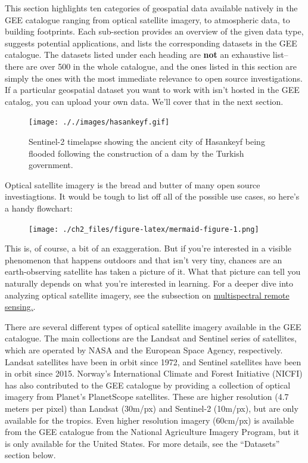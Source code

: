 \documentclass[
  letterpaper,
  DIV=11,
  numbers=noendperiod]{scrreprt}
\begin{document}
This section highlights ten categories of geospatial data available
natively in the GEE catalogue ranging from optical satellite imagery, to
atmospheric data, to building footprints. Each sub-section provides an
overview of the given data type, suggests potential applications, and
lists the corresponding datasets in the GEE catalogue. The datasets
listed under each heading are \textbf{not} an exhaustive list-- there
are over 500 in the whole catalogue, and the ones listed in this section
are simply the ones with the most immediate relevance to open source
investigations. If a particular geospatial dataset you want to work with
isn't hosted in the GEE catalog, you can upload your own data. We'll
cover that in the next section.

\begin{figure}

{\centering \texttt{[image: ././images/hasankeyf.gif]}

}

\caption{Sentinel-2 timelapse showing the ancient city of Hasankeyf
being flooded following the construction of a dam by the Turkish
government.}

\end{figure}

Optical satellite imagery is the bread and butter of many open source
investiagtions. It would be tough to list off all of the possible use
cases, so here's a handy flowchart:

\begin{figure}[H]

{\centering \texttt{[image: ./ch2\_files/figure-latex/mermaid-figure-1.png]}

}

\end{figure}

This is, of course, a bit of an exaggeration. But if you're interested
in a visible phenomenon that happens outdoors and that isn't very tiny,
chances are an earth-observing satellite has taken a picture of it. What
that picture can tell you naturally depends on what you're interested in
learning. For a deeper dive into analyzing optical satellite imagery,
see the subsection on
\protect\hyperlink{multispectral-remote-sensing-remote_sensing}{multispectral
remote sensing.}.

There are several different types of optical satellite imagery available
in the GEE catalogue. The main collections are the Landsat and Sentinel
series of satellites, which are operated by NASA and the European Space
Agency, respectively. Landsat satellites have been in orbit since 1972,
and Sentinel satellites have been in orbit since 2015. Norway's
International Climate and Forest Initiative (NICFI) has also contributed
to the GEE catalogue by providing a collection of optical imagery from
Planet's PlanetScope satellites. These are higher resolution (4.7 meters
per pixel) than Landsat (30m/px) and Sentinel-2 (10m/px), but are only
available for the tropics. Even higher resolution imagery (60cm/px) is
available from the GEE catalogue from the National Agriculture Imagery
Program, but it is only available for the United States. For more
details, see the ``Datasets'' section below.
\end{document}
